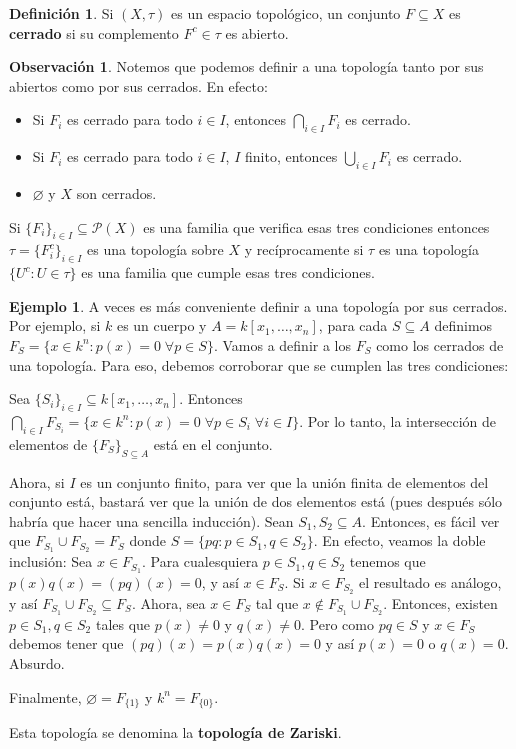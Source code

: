 \documentclass[12pt]{book}
\theoremstyle{definition}
\newtheorem{obs}[teo]{Observación}
\newtheorem{defn}[teo]{Definición}
\newtheorem{ex}[teo]{Ejemplo}
\newcommand{\PP}{\mathscr{P}}
\let\emptyset\varnothing
\begin{document}
\begin{defn}
Si $(X,\tau)$ es un espacio topológico, un conjunto $F\subseteq X$ es \textbf{cerrado} si su complemento $F^c\in \tau$ es abierto.
\end{defn}
\begin{obs}
Notemos que podemos definir a una topología tanto por sus abiertos como por sus cerrados. En efecto:
\begin{itemize}
\item Si $F_i$ es cerrado para todo $i\in I$, entonces $\displaystyle\bigcap_{i\in I} F_i$ es cerrado.
\item Si $F_i$ es cerrado para todo $i\in I$, $I$ finito, entonces $\displaystyle\bigcup_{i\in I}F_i$ es cerrado.
\item $\emptyset$ y $X$ son cerrados.
\end{itemize}
Si $\{F_i\}_{i\in I}\subseteq\PP(X)$ es una familia que verifica esas tres condiciones entonces $\tau = \{F_i^c\}_{i\in I}$ es una topología sobre $X$ y recíprocamente si $\tau$ es una topología $\{U^c : U\in \tau\}$ es una familia que cumple esas tres condiciones.
\end{obs}

\begin{ex}
A veces es más conveniente definir a una topología por sus cerrados. Por ejemplo, si $k$ es un cuerpo y $A=k[x_1,\ldots , x_n]$, para cada $S\subseteq A$ definimos $F_S = \{x\in k^n : p(x)=0\;\forall p\in S\}$. Vamos a definir a los $F_S$ como los cerrados de una topología. Para eso, debemos corroborar que se cumplen las tres condiciones:

Sea $\{S_i\}_{i\in I}\subseteq k[x_1,\ldots , x_n]$. Entonces $\displaystyle\bigcap_{i\in I}F_{S_i} = \{x\in k^n : p(x) = 0 \; \forall p\in S_i \;\forall i\in I\}$. Por lo tanto, la intersección de elementos de $\{F_S\}_{S\subseteq A}$ está en el conjunto.

Ahora, si $I$ es un conjunto finito, para ver que la unión finita de elementos del conjunto está, bastará ver que la unión de dos elementos está (pues después sólo habría que hacer una sencilla inducción). Sean $S_1,S_2\subseteq A$. Entonces, es fácil ver que $F_{S_1}\cup F_{S_2} = F_S$ donde $S=\{pq : p\in S_1, q\in S_2\}$. En efecto, veamos la doble inclusión: Sea $x\in F_{S_1}$. Para cualesquiera $p\in S_1, q\in S_2$ tenemos que $p(x)q(x) = (pq)(x) = 0$, y así $x\in F_S$. Si $x\in F_{S_2}$ el resultado es análogo, y así $F_{S_1}\cup F_{S_2}\subseteq F_S$. Ahora, sea $x\in F_S$ tal que $x\notin F_{S_1}\cup F_{S_2}$. Entonces, existen $p\in S_1, q\in S_2$ tales que $p(x)\neq 0$ y $q(x)\neq 0$. Pero como $pq\in S$ y $x\in F_S$ debemos tener que $(pq)(x) = p(x)q(x) = 0$ y así $p(x)=0$ o $q(x)=0$. Absurdo.

Finalmente, $\emptyset = F_{\{1\}}$ y $k^n = F_{\{0\}}$.

Esta topología se denomina la \textbf{topología de Zariski}.

\end{ex}
\end{document}
